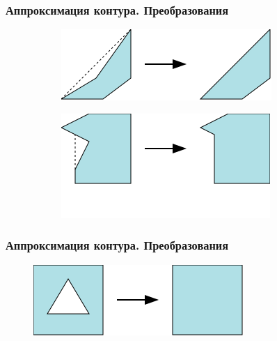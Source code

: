 \documentclass[10pt, unicode]{beamer}
\begin{document}
    \begin{frame}
        \frametitle{Аппроксимация контура. Преобразования}
        \begin{figure}[H]
            \centering
            \begin{subfigure}[t]{\linewidth}
                \centering
                \includegraphics[scale=0.8]{images/earcut.png}
            \end{subfigure}
            \begin{subfigure}[b]{\linewidth}
                \centering
                \includegraphics[scale=0.8]{images/bendneighbor.png}
            \end{subfigure}
        \end{figure}
    \end{frame}
    \begin{frame}
        \frametitle{Аппроксимация контура. Преобразования}
        \begin{figure}[H]
            \centering
            \includegraphics[scale=0.8]{images/remove_triangular_hole.png}
        \end{figure}
    \end{frame}
\end{document}

